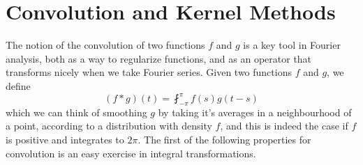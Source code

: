 \section{Convolution and Kernel Methods}

The notion of the convolution of two functions $f$ and $g$ is a key tool in Fourier analysis, both as a way to regularize functions, and as an operator that transforms nicely when we take Fourier series. Given two functions $f$ and $g$, we define
%
\[ (f * g)(t) = \fint_{-\pi}^\pi f(s) g(t-s) \]
%
which we can think of smoothing $g$ by taking it's averages in a neighbourhood of a point, according to a distribution with density $f$, and this is indeed the case if $f$ is positive and integrates to $2\pi$. The first of the following properties for convolution is an easy exercise in integral transformations.

